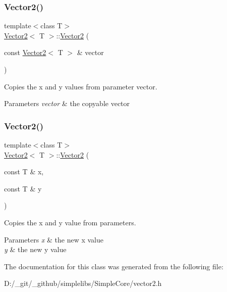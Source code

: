 \subsubsection{\texorpdfstring{Vector2()}{Vector2()}\hspace{0.1cm}{\footnotesize\ttfamily [1/2]}}
{\footnotesize\ttfamily template$<$class T$>$ \\
\mbox{\hyperlink{class_vector2}{Vector2}}$<$ T $>$\+::\mbox{\hyperlink{class_vector2}{Vector2}} (\begin{DoxyParamCaption}\item[{const \mbox{\hyperlink{class_vector2}{Vector2}}$<$ T $>$ \&}]{vector }\end{DoxyParamCaption})\hspace{0.3cm}{\ttfamily [inline]}}



Copies the x and y values from parameter vector. 


\begin{DoxyParams}{Parameters}
{\em vector} & the copyable vector \\
\hline
\end{DoxyParams}
\mbox{\label{class_vector2_ae1eb7e93804f74959b1d0e568e4f4bd9}} 
\subsubsection{\texorpdfstring{Vector2()}{Vector2()}\hspace{0.1cm}{\footnotesize\ttfamily [2/2]}}
{\footnotesize\ttfamily template$<$class T$>$ \\
\mbox{\hyperlink{class_vector2}{Vector2}}$<$ T $>$\+::\mbox{\hyperlink{class_vector2}{Vector2}} (\begin{DoxyParamCaption}\item[{const T \&}]{x,  }\item[{const T \&}]{y }\end{DoxyParamCaption})\hspace{0.3cm}{\ttfamily [inline]}}



Copies the x and y value from parameters. 


\begin{DoxyParams}{Parameters}
{\em x} & the new x value \\
\hline
{\em y} & the new y value \\
\hline
\end{DoxyParams}


The documentation for this class was generated from the following file\+:\begin{DoxyCompactItemize}
\item 
D\+:/\+\_\+git/\+\_\+github/simplelibs/\+Simple\+Core/vector2.\+h\end{DoxyCompactItemize}
